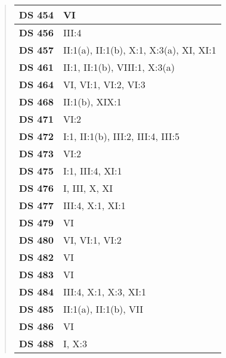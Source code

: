 \begin{quote}
\begin{xltabular}{\linewidth}{ l | X }
        \textbf {DS 454} & VI \\ \hline
    
        \textbf {DS 456} & III:4 \\ \hline
    
        \textbf {DS 457} & II:1(a), II:1(b), X:1, X:3(a), XI, XI:1 \\ \hline
    
        \textbf {DS 461} & II:1, II:1(b), VIII:1, X:3(a) \\ \hline
    
        \textbf {DS 464} & VI, VI:1, VI:2, VI:3 \\ \hline
    
        \textbf {DS 468} & II:1(b), XIX:1 \\ \hline
    
        \textbf {DS 471} & VI:2 \\ \hline
    
        \textbf {DS 472} & I:1, II:1(b), III:2, III:4, III:5 \\ \hline
    
        \textbf {DS 473} & VI:2 \\ \hline
    
        \textbf {DS 475} & I:1, III:4, XI:1 \\ \hline
    
        \textbf {DS 476} & I, III, X, XI \\ \hline
    
        \textbf {DS 477} & III:4, X:1, XI:1 \\ \hline
    
        \textbf {DS 479} & VI \\ \hline
    
        \textbf {DS 480} & VI, VI:1, VI:2 \\ \hline
    
        \textbf {DS 482} & VI \\ \hline
    
        \textbf {DS 483} & VI \\ \hline
    
        \textbf {DS 484} & III:4, X:1, X:3, XI:1 \\ \hline
    
        \textbf {DS 485} & II:1(a), II:1(b), VII \\ \hline
    
        \textbf {DS 486} & VI \\ \hline
    
        \textbf {DS 488} & I, X:3 \\ \hline
    

\end{xltabular}
\end{quote}
